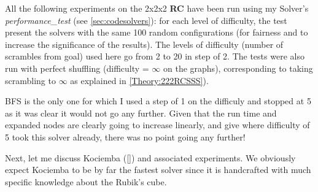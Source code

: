 All the following experiments on the 2x2x2 \textbf{RC} have been run using my Solver's \textit{performance\_test} (see \ref{sec:codesolvers}): for each level of difficulty, the test present the solvers with the same 100 random configurations (for fairness and to increase the significance of the results). The levels of difficulty (number of scrambles from goal) used here go from 2 to 20 in step of 2. The tests were also run with perfect shuffling (difficulty = $\infty$ on the graphs), corresponding to taking scrambling to $\infty$ as explained in \ref{Theory:222RCSSS}).

BFS is the only one for which I used a step of 1 on the difficuly and stopped at 5 as it was clear it would not go any further. Given that the run time and expanded nodes are clearly going to increase linearly, and give where difficulty of 5 took this solver already, there was no point going any further!

Next, let me discuss Kociemba (\ref{}) and associated experiments. We obviously expect Kociemba to be by far the fastest solver since it is handcrafted with much specific knowledge about the Rubik's cube.






